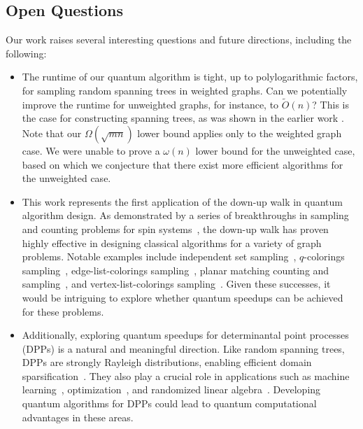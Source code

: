 \documentclass[11pt]{article}
\begin{document}
{\subsection{Open Questions}
Our work raises several interesting questions and future directions, including the following:
\begin{itemize}
	\item The runtime of our quantum algorithm is tight, up to polylogarithmic factors, for sampling random spanning trees in weighted graphs. Can we potentially improve the runtime for unweighted graphs, for instance, to $\widetilde{O}(n)$?
    This is the case for constructing spanning trees, as was shown in the earlier work \cite{DHHM06}.
    Note that our $\Omega(\sqrt{mn})$ lower bound applies only to the weighted graph case. 
    We were unable to prove a $\omega(n)$ lower bound for the unweighted case, based on which we conjecture that there exist more efficient algorithms for the unweighted case.
	
	\item This work represents the first application of the down-up walk in quantum algorithm design. As demonstrated by a series of breakthroughs in sampling and counting problems for spin systems~\cite{alev2020improved,anari2021spectral,chen2021rapid,jain2021spectral,alimohammadi2021fractionally,liu2021coupling,blanca2022mixing,abdolazimi2022matrix}, the down-up walk has proven highly effective in designing classical algorithms for a variety of graph problems. Notable examples include independent set sampling~\cite{alev2020improved,anari2021spectral}, $q$-colorings sampling~\cite{chen2021rapid,jain2021spectral,blanca2022mixing}, edge-list-colorings sampling~\cite{abdolazimi2022matrix}, planar matching counting and sampling~\cite{alimohammadi2021fractionally}, and vertex-list-colorings sampling~\cite{liu2021coupling}. Given these successes, it would be intriguing to explore whether quantum speedups can be achieved for these problems. 
	
\item Additionally, exploring quantum speedups for determinantal point processes (DPPs) is a natural and meaningful direction. Like random spanning trees, DPPs are strongly Rayleigh distributions, enabling efficient domain sparsification~\cite{anari2020isotropy,anari2021domain,ALV22}. They also play a crucial role in applications such as machine learning~\cite{kulesza2011k,kulesza2012determinantal,derezinski2020improved}, optimization~\cite{derezinski2020debiasing,derezinski2020improved,nikolov2022proportional}, and randomized linear algebra~\cite{derezinski2017unbiased,derezinski2019minimax,derezinski2024solving}. Developing quantum algorithms for DPPs could lead to quantum computational advantages in these areas.
\end{itemize}



}
\end{document}
